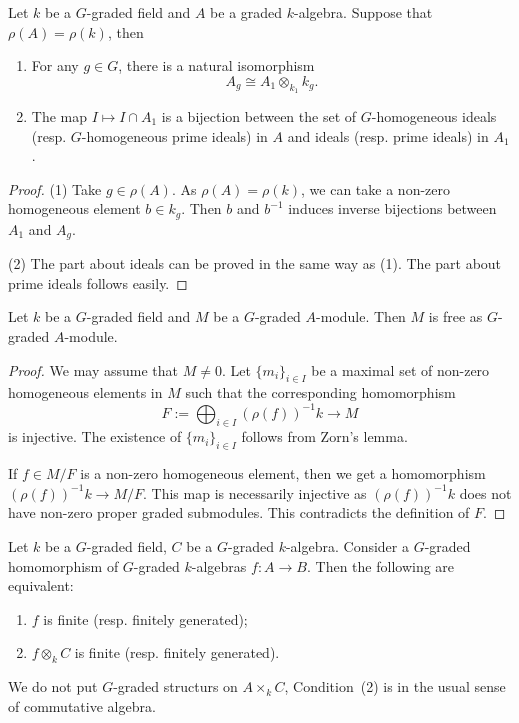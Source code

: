 \begin{lemma}
    Let $k$ be a $G$-graded field and $A$ be a graded $k$-algebra. Suppose that $\rho(A)=\rho(k)$, then
    \begin{enumerate}
        \item For any $g\in G$, there is a natural isomorphism
            \[
                A_g\cong A_1 \otimes_{k_1} k_g.
            \]
        \item The map $I\mapsto I\cap A_1$ is a bijection between the set of $G$-homogeneous ideals (resp. $G$-homogeneous prime ideals) in $A$ and ideals (resp. prime ideals) in $A_1$.
    \end{enumerate}
\end{lemma}
\begin{proof}
    (1) Take $g\in \rho(A)$. As $\rho(A)=\rho(k)$, we can take a non-zero homogeneous element $b\in k_g$. Then $b$ and $b^{-1}$ induces inverse bijections between $A_1$ and $A_g$.

    (2) The part about ideals can be proved in the same way as (1). The part about prime ideals follows easily.
\end{proof}

\begin{proposition}\label{prop-gradedmoduleofgradedringfree}
    Let $k$ be a $G$-graded field and $M$ be a $G$-graded $A$-module. Then $M$ is free as $G$-graded $A$-module.
\end{proposition}
\begin{proof}
    We may assume that $M\neq 0$.
    Let $\{m_i\}_{i\in I}$ be a maximal set of non-zero homogeneous elements in $M$ such that the corresponding homomorphism 
    \[
        F:=\bigoplus_{i\in I} (\rho(f))^{-1}k\rightarrow M  
    \] 
    is injective. The existence of $\{m_i\}_{i\in I}$ follows from Zorn's lemma.

    If $f\in M/F$ is a non-zero homogeneous element, then we get a homomorphism $(\rho(f))^{-1}k\rightarrow M/F$. This map is necessarily injective as $(\rho(f))^{-1}k$ does not have non-zero proper graded submodules. This contradicts the definition of $F$.
\end{proof}

\begin{corollary}
    Let $k$ be a $G$-graded field, $C$ be a $G$-graded $k$-algebra. Consider a $G$-graded homomorphism of $G$-graded $k$-algebras $f:A\rightarrow B$. Then the following are equivalent:
    \begin{enumerate}
        \item $f$ is finite (resp. finitely generated);
        \item $f\otimes_k C$ is finite (resp. finitely generated).
    \end{enumerate}
\end{corollary}
We do not put $G$-graded structurs on $A\times_k C$, Condition~(2) is in the usual sense of commutative algebra.

